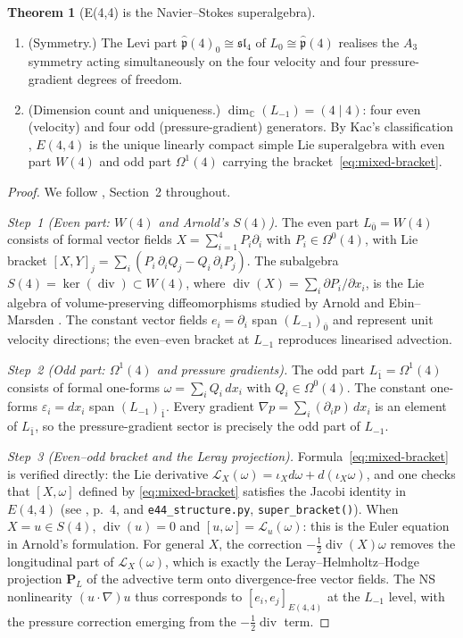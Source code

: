 \documentclass[reqno,10pt]{amsart}
\theoremstyle{definition}
\newtheorem{theor}[subsubsection]{Theorem}
\def\Wn{W(4)}
\def\Sn{S(4)}
\def\Cset{{\mathbb{C}}}
\def\divX{{\operatorname{div}}}
\def\phat{\hat{\mathfrak{p}}}
\def\slN{{\mathfrak{sl}}_4}
\begin{document}
\begin{theor}[E(4,4) is the Navier--Stokes superalgebra]
\begin{enumerate}
\item[(vi)] \textup{(Symmetry.)}
The Levi part $\phat(4)_0\cong\slN$ of $L_0\cong\phat(4)$ realises the
$A_3$ symmetry acting simultaneously on the four velocity and four
pressure-gradient degrees of freedom.

\item[(vii)] \textup{(Dimension count and uniqueness.)}
$\dim_{\Cset}(L_{-1}) = (4\mid 4)$: four even (velocity) and four odd
(pressure-gradient) generators.  By Kac's classification \cite{Kac1998},
$E(4,4)$ is the unique linearly compact simple Lie superalgebra with even
part $\Wn$ and odd part $\Omega^1(4)$ carrying the bracket~\eqref{eq:mixed-bracket}.
\end{enumerate}
\end{theor}

\begin{proof}
We follow \cite{CCK2026}, Section~2 throughout.

\smallskip
\noindent\textit{Step~1 (Even part: $\Wn$ and Arnold's $\Sn$).}
The even part $L_{\bar 0} = \Wn$ consists of formal vector fields
$X = \sum_{i=1}^4 P_i\partial_i$ with $P_i\in\Omega^0(4)$, with Lie bracket
$[X,Y]_j = \sum_i(P_i\,\partial_i Q_j - Q_i\,\partial_i P_j)$.
The subalgebra $\Sn = \ker(\divX)\subset\Wn$, where
$\divX(X) = \sum_i\partial P_i/\partial x_i$, is the Lie algebra of
volume-preserving diffeomorphisms studied by Arnold \cite{Arnold1966} and
Ebin--Marsden \cite{EbinMarsden1970}.  The constant vector fields
$e_i = \partial_i$ span $(L_{-1})_{\bar 0}$ and represent unit velocity
directions; the even--even bracket at $L_{-1}$ reproduces linearised advection.

\smallskip
\noindent\textit{Step~2 (Odd part: $\Omega^1(4)$ and pressure gradients).}
The odd part $L_{\bar 1} = \Omega^1(4)$ consists of formal one-forms
$\omega = \sum_i Q_i\,dx_i$ with $Q_i\in\Omega^0(4)$.  The constant
one-forms $\varepsilon_i = dx_i$ span $(L_{-1})_{\bar 1}$.  Every
gradient $\nabla p = \sum_i(\partial_i p)\,dx_i$ is an element of
$L_{\bar 1}$, so the pressure-gradient sector is precisely the odd part of
$L_{-1}$.

\smallskip
\noindent\textit{Step~3 (Even--odd bracket and the Leray projection).}
Formula~\eqref{eq:mixed-bracket} is verified directly: the Lie derivative
$\mathcal{L}_X(\omega) = \iota_X d\omega + d(\iota_X\omega)$, and one checks
that $[X,\omega]$ defined by \eqref{eq:mixed-bracket} satisfies the Jacobi
identity in $E(4,4)$ (see \cite{CCK2026}, p.~4, and \texttt{e44\_structure.py},
\texttt{super\_bracket()}).  When $X = u\in\Sn$, $\divX(u) = 0$
and $[u,\omega] = \mathcal{L}_u(\omega)$: this is the Euler equation in
Arnold's formulation.  For general $X$, the correction
$-\tfrac{1}{2}\divX(X)\omega$ removes the longitudinal part of
$\mathcal{L}_X(\omega)$, which is exactly the Leray--Helmholtz--Hodge
projection $\mathbf{P}_L$ of the advective term onto divergence-free
vector fields.  The NS nonlinearity $(u\cdot\nabla)u$ thus corresponds
to $[e_i,e_j]_{E(4,4)}$ at the $L_{-1}$ level, with the pressure correction
emerging from the $-\tfrac{1}{2}\divX$ term.


\end{proof}
\end{document}

